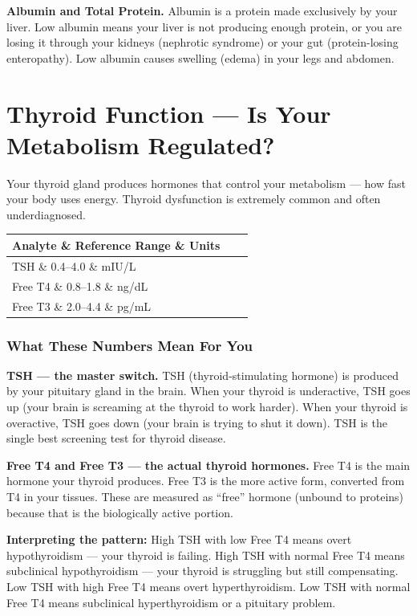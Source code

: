 \textbf{Albumin and Total Protein.} Albumin is a protein made exclusively by your liver. Low albumin means your liver is not producing enough protein, or you are losing it through your kidneys (nephrotic syndrome) or your gut (protein-losing enteropathy). Low albumin causes swelling (edema) in your legs and abdomen.

\clearpage
\section{Thyroid Function --- Is Your Metabolism Regulated?}

Your thyroid gland produces hormones that control your metabolism --- how fast your body uses energy. Thyroid dysfunction is extremely common and often underdiagnosed.

\begin{longtable}{@{}lll@{}}
\toprule
\textbf{Analyte} \& \textbf{Reference Range} \& \textbf{Units} \\
\midrule
TSH \& 0.4--4.0 \& mIU/L \\
Free T4 \& 0.8--1.8 \& ng/dL \\
Free T3 \& 2.0--4.4 \& pg/mL \\
\bottomrule
\end{longtable}

\subsubsection{What These Numbers Mean For You}

\textbf{TSH --- the master switch.} TSH (thyroid-stimulating hormone) is produced by your pituitary gland in the brain. When your thyroid is underactive, TSH goes up (your brain is screaming at the thyroid to work harder). When your thyroid is overactive, TSH goes down (your brain is trying to shut it down). TSH is the single best screening test for thyroid disease.

\textbf{Free T4 and Free T3 --- the actual thyroid hormones.} Free T4 is the main hormone your thyroid produces. Free T3 is the more active form, converted from T4 in your tissues. These are measured as ``free'' hormone (unbound to proteins) because that is the biologically active portion.

\textbf{Interpreting the pattern:} High TSH with low Free T4 means overt hypothyroidism --- your thyroid is failing. High TSH with normal Free T4 means subclinical hypothyroidism --- your thyroid is struggling but still compensating. Low TSH with high Free T4 means overt hyperthyroidism. Low TSH with normal Free T4 means subclinical hyperthyroidism or a pituitary problem.

